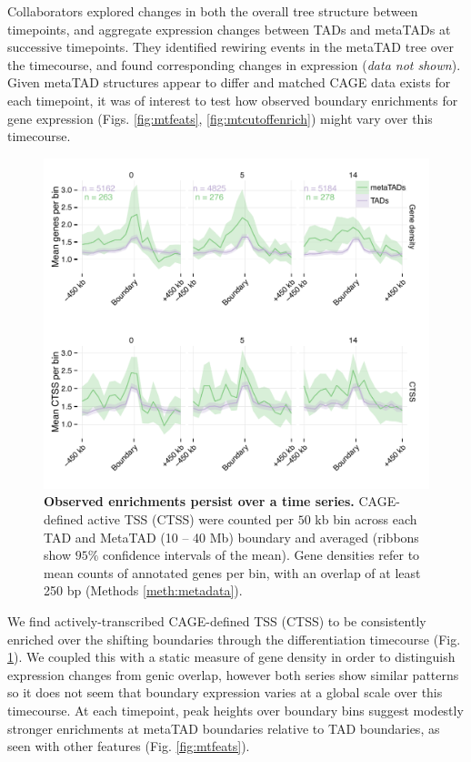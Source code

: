 \documentclass[a4paper,11pt,oneside]{book}
\begin{document}
Collaborators explored changes in both the overall tree structure between timepoints, and aggregate expression changes between TADs and metaTADs at successive timepoints. They identified rewiring events in the metaTAD tree over the timecourse, and found corresponding changes in expression (\emph{data not shown}). Given metaTAD structures appear to differ and matched CAGE data exists for each timepoint, it was of interest to test how observed boundary enrichments for gene expression (Figs. \ref{fig:mtfeats}, \ref{fig:mtcutoffenrich}) might vary over this timecourse. 

\begin{figure}
\begin{center} 
\includegraphics[width=4.5in]{mt_ts.pdf}
\captionsetup{width=\textwidth}
\caption[Observed enrichments persist over a time series.]{ {\bf Observed enrichments persist over a time series.}
CAGE-defined active TSS (CTSS) were counted per $50$ kb bin across each TAD and MetaTAD (10 -- 40 Mb) boundary and averaged (ribbons show $95\%$ confidence intervals of the mean). Gene densities refer to mean counts of annotated genes per bin, with an overlap of at least 250 bp (Methods \ref{meth:metadata}).
}\label{fig:mtts}
\end{center}
\end{figure} 

We find actively-transcribed CAGE-defined TSS (CTSS) to be consistently enriched over the shifting boundaries through the differentiation timecourse (Fig. \ref{fig:mtts}). We coupled this with a static measure of gene density in order to distinguish expression changes from genic overlap, however both series show similar patterns so it does not seem that boundary expression varies at a global scale over this timecourse. At each timepoint, peak heights over boundary bins suggest modestly stronger enrichments at metaTAD boundaries relative to TAD boundaries, as seen with other features (Fig. \ref{fig:mtfeats}). 
\end{document}
